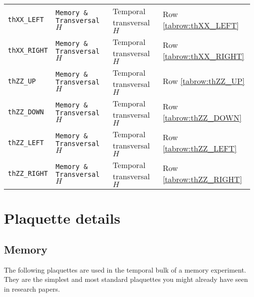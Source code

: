 \documentclass{article}
\newcommand{\internalTableLine}[3]{\texttt{#1} & \texttt{#2} & #3 & Row \ref{tabrow:#1}}
\begin{document}
\begin{longtable}{ |l|l|l|l| }
    \internalTableLine{thXX_LEFT}{Memory \& Transversal $H$}{Temporal transversal $H$} \\
    \internalTableLine{thXX_RIGHT}{Memory \& Transversal $H$}{Temporal transversal $H$} \\
    \internalTableLine{thZZ_UP}{Memory \& Transversal $H$}{Temporal transversal $H$} \\
    \internalTableLine{thZZ_DOWN}{Memory \& Transversal $H$}{Temporal transversal $H$} \\
    \internalTableLine{thZZ_LEFT}{Memory \& Transversal $H$}{Temporal transversal $H$} \\
    \internalTableLine{thZZ_RIGHT}{Memory \& Transversal $H$}{Temporal transversal $H$} \\
    \hline
\end{longtable}

\newpage
\section{Plaquette details}

\subsection{Memory}

The following plaquettes are used in the temporal bulk of a memory experiment. They are 
the simplest and most standard plaquettes you might already have seen in research papers.
\end{document}

